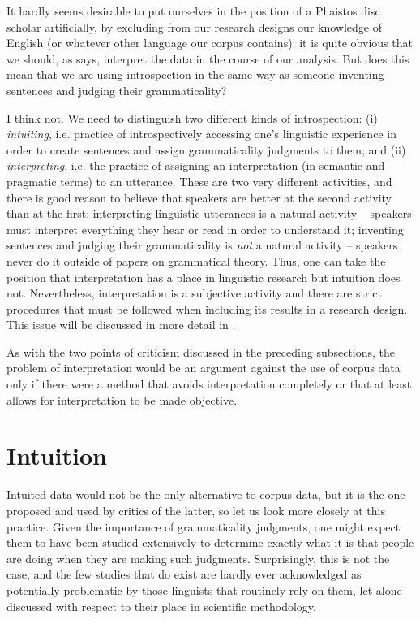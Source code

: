 It hardly seems desirable to put ourselves in the position of a Phaistos disc scholar artificially, by excluding from our research designs  our knowledge of English (or whatever other language our corpus contains); it is quite obvious that we should, as \citet{lakoff_re:_2004} says, interpret the data in the course of our analysis. But does this mean that we are using introspection  in the same way as someone inventing sentences and judging their  grammaticality?

I think not. We need to distinguish two different kinds of introspection:  (i) \emph{intuiting},  i.e. practice of introspectively accessing one's linguistic experience in order to create sentences and assign grammaticality  judgments to them; and (ii) \emph{interpreting}, i.e. the practice of assigning an interpretation (in semantic  and pragmatic  terms) to an utterance. These are two very different activities, and there is good reason to believe that speakers are better at the second activity than at the first: interpreting linguistic utterances is a natural activity -- speakers must interpret everything they hear or read in order to understand it; inventing sentences and judging their grammaticality  is \emph{not} a natural activity -- speakers never do it outside of papers on grammatical theory. Thus, one can take the position that interpretation has a place in linguistic research but intuition  does not. Nevertheless, interpretation is a subjective activity and there are strict procedures that must be followed when including its results in a research design.  This issue will be discussed in more detail in .

As with the two points of criticism discussed in the preceding subsections, the problem of interpretation would be an argument against the use of corpus data only if there were a method that avoids interpretation completely or that at least allows for interpretation to be made objective.

\section{Intuition}
\label{sec:intuition}

Intuited  data would not be the only alternative to corpus data, but it is the one proposed and used by critics of the latter, so let us look more closely at this practice. Given the importance of grammaticality  judgments, one might expect them to have been studied extensively to determine exactly what it is that people are doing when they are making such judgments. Surprisingly, this is not the case, and the few studies that do exist are hardly ever acknowledged as potentially problematic by those linguists that routinely rely on them, let alone discussed with respect to their place in scientific methodology.

